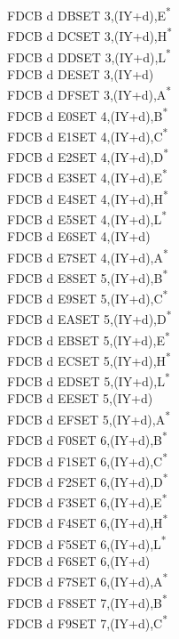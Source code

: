 \documentclass[oneside,a4paper]{book}
\begin{document}
\begin{multicols}{3}
{\begin{tabbing}
FDCB d DB\>SET 3,(IY+d),E\textsuperscript{*}\\
FDCB d DC\>SET 3,(IY+d),H\textsuperscript{*}\\
FDCB d DD\>SET 3,(IY+d),L\textsuperscript{*}\\
FDCB d DE\>SET 3,(IY+d)\\
FDCB d DF\>SET 3,(IY+d),A\textsuperscript{*}\\
FDCB d E0\>SET 4,(IY+d),B\textsuperscript{*}\\
FDCB d E1\>SET 4,(IY+d),C\textsuperscript{*}\\
FDCB d E2\>SET 4,(IY+d),D\textsuperscript{*}\\
FDCB d E3\>SET 4,(IY+d),E\textsuperscript{*}\\
FDCB d E4\>SET 4,(IY+d),H\textsuperscript{*}\\
FDCB d E5\>SET 4,(IY+d),L\textsuperscript{*}\\
FDCB d E6\>SET 4,(IY+d)\\
FDCB d E7\>SET 4,(IY+d),A\textsuperscript{*}\\
FDCB d E8\>SET 5,(IY+d),B\textsuperscript{*}\\
FDCB d E9\>SET 5,(IY+d),C\textsuperscript{*}\\
FDCB d EA\>SET 5,(IY+d),D\textsuperscript{*}\\
FDCB d EB\>SET 5,(IY+d),E\textsuperscript{*}\\
FDCB d EC\>SET 5,(IY+d),H\textsuperscript{*}\\
FDCB d ED\>SET 5,(IY+d),L\textsuperscript{*}\\
FDCB d EE\>SET 5,(IY+d)\\
FDCB d EF\>SET 5,(IY+d),A\textsuperscript{*}\\
FDCB d F0\>SET 6,(IY+d),B\textsuperscript{*}\\
FDCB d F1\>SET 6,(IY+d),C\textsuperscript{*}\\
FDCB d F2\>SET 6,(IY+d),D\textsuperscript{*}\\
FDCB d F3\>SET 6,(IY+d),E\textsuperscript{*}\\
FDCB d F4\>SET 6,(IY+d),H\textsuperscript{*}\\
FDCB d F5\>SET 6,(IY+d),L\textsuperscript{*}\\
FDCB d F6\>SET 6,(IY+d)\\
FDCB d F7\>SET 6,(IY+d),A\textsuperscript{*}\\
FDCB d F8\>SET 7,(IY+d),B\textsuperscript{*}\\
FDCB d F9\>SET 7,(IY+d),C\textsuperscript{*}\\

\end{tabbing}}
\end{multicols}
\end{document}
